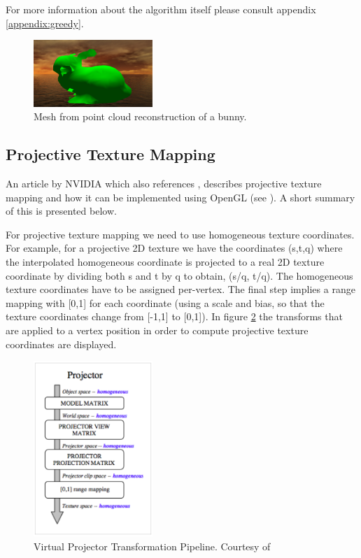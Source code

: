\documentclass[]{article}
\begin{document}
For more information about the algorithm itself please consult appendix \ref{appendix:greedy}.

 
\begin{figure}[hbtp]
    \centering
    \includegraphics[width=0.4\textwidth]{figures/reconstructedBunny.png}
    \caption{Mesh from point cloud reconstruction of a bunny.}
    \label{fig:ReconstructedBunny}
\end{figure}

\subsection{Projective Texture Mapping}
\label{sec:ptm}

An article by NVIDIA which also references \cite{segal92}, describes projective texture mapping and how it can be implemented using OpenGL (see \cite{cassNvidia}). A short summary of this is presented below.

For projective texture mapping we need to use homogeneous texture coordinates. For example, for a projective 2D texture we have the coordinates (s,t,q) where the interpolated homogeneous coordinate is projected to a real 2D texture coordinate by dividing both s and t by q to obtain, (s/q, t/q). The homogeneous texture coordinates have to be assigned per-vertex. The final step implies a range mapping with [0,1] for each coordinate (using a scale and bias, so that the texture coordinates change from [-1,1] to [0,1]). In figure \ref{fig:VirtualProjectorPipeline} the transforms that are applied to a vertex position in order to compute projective texture coordinates are displayed.

\begin{figure}[hbtp]
    \centering
    \includegraphics[width=0.4\textwidth]{figures/VirtualProjectorPipeline.PNG}
    \caption{Virtual Projector Transformation Pipeline. Courtesy of \cite{cassNvidia}}
    \label{fig:VirtualProjectorPipeline}
\end{figure}
\end{document}
